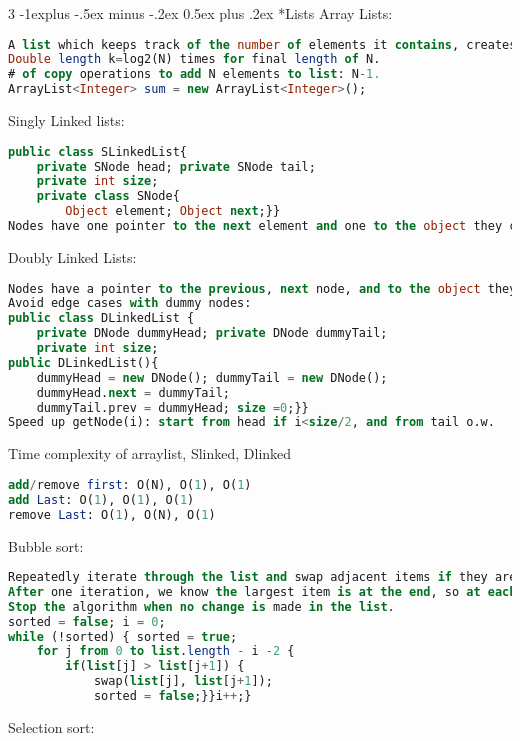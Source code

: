 \documentclass[10pt,landscape]{article}
\makeatletter
\renewcommand{\subsection}{\@startsection{subsection}{2}{0mm}%
                                {-1explus -.5ex minus -.2ex}%
                                {0.5ex plus .2ex}%
                                {\normalfont\normalsize\bfseries}}
\makeatother
\begin{document}
\begin{multicols}{3}
\subsection*{Lists}
Array Lists:
\begin{lstlisting}[language=SQL]
A list which keeps track of the number of elements it contains, creates a new array double its size and copies each element to it each time it reaches its limit. Cannot store primitive types, must use wrapper.
Double length k=log2(N) times for final length of N. 
# of copy operations to add N elements to list: N-1. 
ArrayList<Integer> sum = new ArrayList<Integer>();
\end{lstlisting}
Singly Linked lists:
\begin{lstlisting}[language=SQL]
public class SLinkedList{
    private SNode head; private SNode tail;
    private int size;
    private class SNode{
        Object element; Object next;}}
Nodes have one pointer to the next element and one to the object they contain.
\end{lstlisting}
Doubly Linked Lists: 
\begin{lstlisting}[language=SQL]
Nodes have a pointer to the previous, next node, and to the object they contain. 
Avoid edge cases with dummy nodes: 
public class DLinkedList {
    private DNode dummyHead; private DNode dummyTail;
    private int size;
public DLinkedList(){
    dummyHead = new DNode(); dummyTail = new DNode();
    dummyHead.next = dummyTail; 
    dummyTail.prev = dummyHead; size =0;}}
Speed up getNode(i): start from head if i<size/2, and from tail o.w.
\end{lstlisting}
Time complexity of arraylist, Slinked, Dlinked
\begin{lstlisting}[language=SQL]
add/remove first: O(N), O(1), O(1)  
add Last: O(1), O(1), O(1)
remove Last: O(1), O(N), O(1)
\end{lstlisting}
Bubble sort:
\begin{lstlisting}[language=SQL]
Repeatedly iterate through the list and swap adjacent items if they are in the wrong order. 
After one iteration, we know the largest item is at the end, so at each iteration we can stop comparing items one step earlier. 
Stop the algorithm when no change is made in the list. 
sorted = false; i = 0;
while (!sorted) { sorted = true;
    for j from 0 to list.length - i -2 {
        if(list[j] > list[j+1]) {
            swap(list[j], list[j+1]);
            sorted = false;}}i++;}
\end{lstlisting}
Selection sort:
\begin{lstlisting}[language=SQL]

\end{lstlisting}
\end{multicols}
\end{document}
